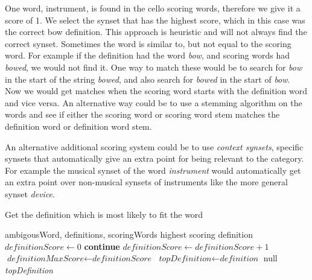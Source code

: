 \noindent{}
One word, instrument, is found in the cello scoring words, therefore we give it a score of 1. We select the synset that has the highest score, which in this case was the correct bow definition. This approach is heuristic and will not always find the correct synset.
Sometimes the word is similar to, but not equal to the scoring word. For example if the definition had the word \emph{bow}, and scoring words had \emph{bowed}, we would not find it. One way to match these would be to search for \emph{bow} in the start of the string \emph{bowed}, and also search for \emph{bowed} in the start of \emph{bow}. Now we would get matches when the scoring word starts with the definition word and vice versa. An alternative way could be to use a stemming algorithm on the words and see if either the scoring word or scoring word stem matches the definition word or definition word stem.

An alternative additional scoring system could be to use \emph{context synsets}, specific synsets that automatically give an extra point for being relevant to the category. For example the musical synset of the word \emph{instrument} would automatically get an extra point over non-musical synsets of instruments like the more general synset \emph{device}.

\begin{algorithm}
	\caption{Get the definition which is most likely to fit the word}\label{euclid}
	\begin{algorithmic}[1]
		\Require ambigousWord,
		definitions,
		scoringWords
		\Ensure highest scoring definition
		\State $\textit{definitionScore} \gets 0$
		\State \textbf{continue}
		\EndIf
		\State ${\textit{definitionScore} \gets {\textit{definitionScore}+1}}$
		\EndIf
		\EndFor
		\EndFor
		\State ${\textit{definitionMaxScore}} \gets {\textit{definitionScore}}$
		\State ${\textit{topDefinition}} \gets {\textit{definition}}$
		\EndIf
		\EndFor
		\Return null
		\EndIf
		\State \Return \textit{topDefinition}
		\EndProcedure
	\end{algorithmic}
\end{algorithm}

